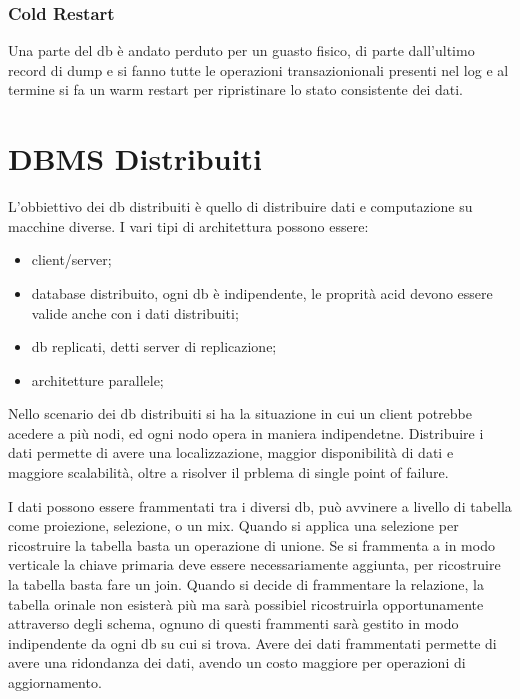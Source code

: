 \documentclass[12pt]{article}
\begin{document}
\subsubsection{Cold Restart}
Una parte del db \`e andato perduto per un guasto fisico, di parte dall'ultimo record di dump e si fanno tutte le operazioni transazionionali presenti nel log e al termine si fa un warm restart per ripristinare lo stato consistente dei dati.





\newpage
\section{DBMS Distribuiti}
L'obbiettivo dei db distribuiti \`e quello di distribuire dati e computazione su macchine diverse. I vari tipi di architettura possono essere:
\begin{itemize}
    \item client/server;
    \item database distribuito, ogni db \`e indipendente, le proprit\`a acid devono essere valide anche con i dati distribuiti;
    \item db replicati, detti server di replicazione;
    \item architetture parallele;
\end{itemize}
Nello scenario dei db distribuiti si ha la situazione in cui un client potrebbe acedere a pi\`u nodi, ed ogni nodo opera in maniera indipendetne. Distribuire i dati permette di  avere una localizzazione, maggior disponibilit\`a di dati e maggiore scalabilit\`a, oltre a risolver il prblema di single point of failure.

I dati possono essere frammentati tra i diversi db, pu\`o avvinere a livello di tabella come proiezione, selezione, o un mix. Quando si applica una selezione per ricostruire la tabella basta un operazione di unione. Se si frammenta a in modo verticale la chiave primaria deve essere necessariamente aggiunta, per ricostruire la tabella basta fare un join. Quando si decide di frammentare la relazione, la tabella orinale non esister\`a pi\`u ma sar\`a possibiel ricostruirla opportunamente attraverso degli schema, ognuno di questi frammenti sar\`a gestito in modo indipendente da ogni db su cui si trova. Avere dei dati frammentati permette di avere una ridondanza dei dati, avendo un costo maggiore per operazioni di aggiornamento.
\end{document}
